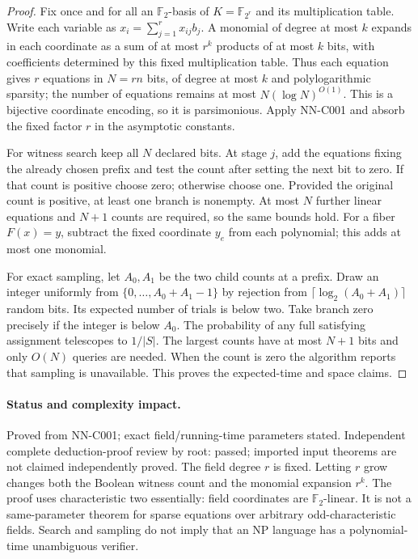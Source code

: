 \begin{proof}
Fix once and for all an $\mathbb F_2$-basis of $K=\mathbb F_{2^r}$ and its multiplication table. Write each variable as $x_i=\sum_{j=1}^r x_{ij}b_j$. A monomial of degree at most $k$ expands in each coordinate as a sum of at most $r^k$ products of at most $k$ bits, with coefficients determined by this fixed multiplication table. Thus each equation gives $r$ equations in $N=rn$ bits, of degree at most $k$ and polylogarithmic sparsity; the number of equations remains at most $N(\log N)^{O(1)}$. This is a bijective coordinate encoding, so it is parsimonious. Apply NN-C001 and absorb the fixed factor $r$ in the asymptotic constants.

For witness search keep all $N$ declared bits. At stage $j$, add the equations fixing the already chosen prefix and test the count after setting the next bit to zero. If that count is positive choose zero; otherwise choose one. Provided the original count is positive, at least one branch is nonempty. At most $N$ further linear equations and $N+1$ counts are required, so the same bounds hold. For a fiber $F(x)=y$, subtract the fixed coordinate $y_e$ from each polynomial; this adds at most one monomial.

For exact sampling, let $A_0,A_1$ be the two child counts at a prefix. Draw an integer uniformly from $\{0,\ldots,A_0+A_1-1\}$ by rejection from $\lceil\log_2(A_0+A_1)\rceil$ random bits. Its expected number of trials is below two. Take branch zero precisely if the integer is below $A_0$. The probability of any full satisfying assignment telescopes to $1/|S|$. The largest counts have at most $N+1$ bits and only $O(N)$ queries are needed. When the count is zero the algorithm reports that sampling is unavailable. This proves the expected-time and space claims.
\end{proof}
\paragraph{Status and complexity impact.}
Proved from NN-C001; exact field/running-time parameters stated. Independent complete deduction-proof review by root: passed; imported input theorems are not claimed independently proved. The field degree $r$ is fixed. Letting $r$ grow changes both the Boolean witness count and the monomial expansion $r^k$. The proof uses characteristic two essentially: field coordinates are $\mathbb F_2$-linear. It is not a same-parameter theorem for sparse equations over arbitrary odd-characteristic fields. Search and sampling do not imply that an NP language has a polynomial-time unambiguous verifier.

